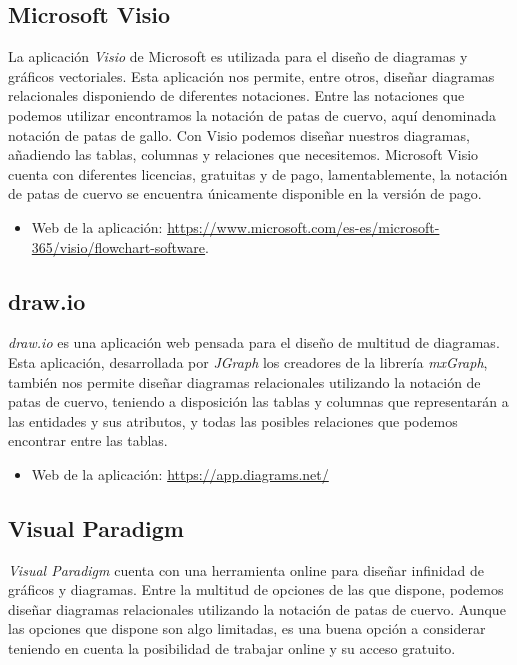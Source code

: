 \subsection{Microsoft Visio}
La aplicación \emph{Visio} de Microsoft es utilizada para el diseño de diagramas y gráficos vectoriales. Esta aplicación nos permite, entre otros, diseñar diagramas relacionales disponiendo de diferentes notaciones. Entre las notaciones que podemos utilizar encontramos la notación de patas de cuervo, aquí denominada notación de patas de gallo. Con Visio podemos diseñar nuestros diagramas, añadiendo las tablas, columnas y relaciones que necesitemos. Microsoft Visio cuenta con diferentes licencias, gratuitas y de pago, lamentablemente, la notación de patas de cuervo se encuentra únicamente disponible en la versión de pago.

\begin{itemize}
    \item Web de la aplicación: \url{https://www.microsoft.com/es-es/microsoft-365/visio/flowchart-software}.
\end{itemize}

\subsection{draw.io}
\emph{draw.io} es una aplicación web pensada para el diseño de multitud de diagramas. Esta aplicación, desarrollada por \emph{JGraph} los creadores de la librería \emph{mxGraph}, también nos permite diseñar diagramas relacionales utilizando la notación de patas de cuervo, teniendo a disposición las tablas y columnas que representarán a las entidades y sus atributos, y todas las posibles relaciones que podemos encontrar entre las tablas.

\begin{itemize}
    \item Web de la aplicación: \url{https://app.diagrams.net/}
\end{itemize}

\subsection{Visual Paradigm}
\emph{Visual Paradigm} cuenta con una herramienta online para diseñar infinidad de gráficos y diagramas. Entre la multitud de opciones de las que dispone, podemos diseñar diagramas relacionales utilizando la notación de patas de cuervo. Aunque las opciones que dispone son algo limitadas, es una buena opción a considerar teniendo en cuenta la posibilidad de trabajar online y su acceso gratuito.

